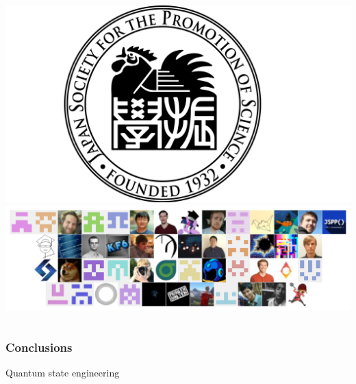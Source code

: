 \documentclass{beamer}
\begin{document}
\begin{frame}
\begin{columns}
\includegraphics[width=\textwidth]{JSPS.png}
\includegraphics[width=\textwidth]{AAA.png}
\end{columns}
\end{frame}

\begin{frame}
\frametitle{Conclusions}
\end{frame}

\begin{frame}
\center \huge Quantum state engineering
\end{frame}
\end{document}
